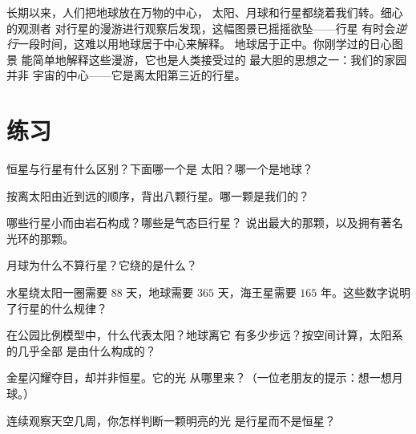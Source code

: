 \begin{remark}[一幅旧图的重绘]\label{rem:g4:solar-system:history}
长期以来，人们把地球放在万物的中心，
太阳、月球和行星都绕着我们转。细心的观测者
对行星的漫游进行观察后发现，这幅图景已摇摇欲坠——行星
有时会\emph{逆行}一段时间，这难以用地球居于中心来解释。
地球居于正中。你刚学过的日心图景
能简单地解释这些漫游，它也是人类接受过的
最大胆的思想之一：我们的家园并非
宇宙的中心——它是离太阳第三近的行星。
\end{remark}

\section{练习}

\begin{exercise}[$\star$]\label{exo:g4:solar-system:1}
恒星与行星有什么区别？下面哪一个是
太阳？哪一个是地球？
\end{exercise}

\begin{exercise}[$\star$]\label{exo:g4:solar-system:2}
按离太阳由近到远的顺序，背出八颗行星。哪一颗是我们的？
\end{exercise}

\begin{exercise}[$\star$]\label{exo:g4:solar-system:3}
哪些行星小而由岩石构成？哪些是气态巨行星？
说出最大的那颗，以及拥有著名光环的那颗。
\end{exercise}

\begin{exercise}[$\star$]\label{exo:g4:solar-system:4}
月球为什么不算行星？它绕的是什么？
\end{exercise}

\begin{exercise}[$\star$]\label{exo:g4:solar-system:5}
水星绕太阳一圈需要 $88$ 天，地球需要 $365$ 天，海王星需要
$165$ 年。这些数字说明了行星的什么规律？
\end{exercise}

\begin{exercise}[$\star$]\label{exo:g4:solar-system:6}
在公园比例模型中，什么代表太阳？地球离它
有多少步远？按空间计算，太阳系的几乎全部
是由什么构成的？
\end{exercise}

\begin{exercise}[$\star$]\label{exo:g4:solar-system:7}
金星闪耀夺目，却并非恒星。它的光
从哪里来？（一位老朋友的提示：想一想月球。）
\end{exercise}

\begin{exercise}[$\star$]\label{exo:g4:solar-system:8}
连续观察天空几周，你怎样判断一颗明亮的光
是行星而不是恒星？
\end{exercise}

